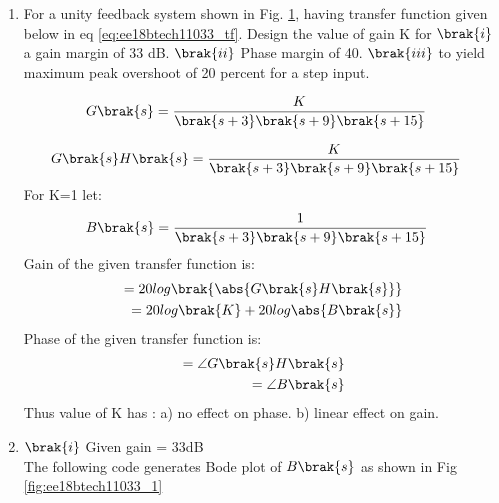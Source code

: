 \begin{enumerate}[label=\thesubsection.\arabic*.,ref=\thesubsection.\theenumi]

\item
For a unity feedback system shown in  Fig.  \ref{fig:ee18btech11033_block}, having transfer function given below in eq \ref{eq:ee18btech11033_tf}.  Design the value of gain K for $\brak{i}$ a gain margin of 33 dB. $\brak{ii}$ Phase margin of 40\degree. $\brak{iii}$ to yield maximum peak overshoot of 20 percent for a step input.

\begin{figure}[!ht]
	\begin{center}
		
		\resizebox{\columnwidth}{!}{}
	\end{center}
\caption{}
\label{fig:ee18btech11033_block}
\end{figure}

\begin{align}
\label{eq:ee18btech11033_tf}
G\brak{s} &= \frac{K}{\brak{s+3}\brak{s+9}\brak{s+15}}
\end{align}
\solution 

\begin{align}
\label{eq:ee18btech11033_Tf(s)}
G\brak{s}H\brak{s} &=\frac{K}{\brak{s+3}\brak{s+9}\brak{s+15}}
\end{align}
For K=1 let:
\begin{align}
\label{eq:ee18btech11033_B(s)}
B\brak{s} &= \frac{1}{\brak{s+3}\brak{s+9}\brak{s+15}}
\end{align}
Gain of the given transfer function is:
\begin{align}
\label{eq:ee18btech11033_gain}
      = 20log\brak{\abs{G\brak{s}H\brak{s}}}
    \\= 20log\brak{K} +20log\abs{B\brak{s}}
\end{align}
Phase of the given transfer function is:
\begin{align}
\label{eq:ee18btech11033_phase}
      = \angle{G\brak{s}H\brak{s}}
    \\= \angle{B\brak{s}}
\end{align}
 Thus value of K has : a) no effect on phase. b) linear effect on gain.




\item $\brak{i}$ Given gain = 33dB
\\
\solution The following code generates Bode plot of $B\brak{s}$ as shown in Fig \ref{fig:ee18btech11033_1}


\end{enumerate}
